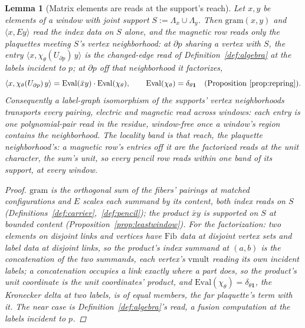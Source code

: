 \documentclass[11pt]{article}
\newtheorem{lemma}{Lemma}
\theoremstyle{definition}
\begin{document}
\begin{lemma}[Matrix elements are reads at the support's reach]
\label{lem:stableentries}
Let $x,y$ be elements of a window with joint support
$S:=\Lambda_x\cup\Lambda_y$. Then $\mathrm{gram}(x,y)$ and
$\langle x,Ey\rangle$ read the index data on $S$ alone, and the magnetic
row reads only the plaquettes meeting $S$'s vertex neighborhood: at
$\partial p$ sharing a vertex with $S$, the entry
$\langle x,\chi_\theta(U_{\partial p})\,y\rangle$ is the changed-edge read
of Definition~\ref{def:algebra} at the labels incident to $p$; at
$\partial p$ off that neighborhood it factorizes,
\[
\langle x,\chi_\theta(U_{\partial p})\,y\rangle
=\mathrm{Eval}(\bar xy)\cdot\mathrm{Eval}(\chi_\theta),
\qquad
\mathrm{Eval}(\chi_\theta)=\delta_{\theta\mathbf 1}
\quad(\text{Proposition~\ref{prop:repring}}) .
\]
Consequently a label-graph isomorphism of the supports' vertex
neighborhoods transports every pairing, electric and magnetic read across
windows: each entry is one polynomial-pair read in the residue, window-free
once a window's region
contains the neighborhood. The \emph{locality band} is that reach,
the plaquette neighborhood's: a magnetic row's entries off it are
the factorized reads at the unit character, the sum's unit, so
every pencil row reads within one band of its support, at every
window.
\begin{proof}
$\mathrm{gram}$ is the orthogonal sum of the fibers' pairings at matched
configurations and $E$ scales each summand by its content, both index
reads on $S$ (Definitions~\ref{def:carrier},~\ref{def:pencil}); the
product $\bar xy$ is supported on $S$ at bounded content
(Proposition~\ref{prop:leastwindow}). For the factorization: two elements
on disjoint links and vertices have $\mathrm{Fib}$ data at disjoint
vertex sets and label data at disjoint links, so the product's index
summand at $(a,b)$ is the concatenation of the two summands, each
vertex's $\mathrm{vmult}$ reading its own incident labels; a concatenation
occupies a link exactly where a part does, so the
product's unit coordinate is the unit coordinates' product,
and $\mathrm{Eval}(\chi_\theta)=\delta_{\theta\mathbf 1}$, the Kronecker
delta at two labels, is of equal members, the far
plaquette's term with it. The near case is Definition~\ref{def:algebra}'s read, a
fusion computation at the labels incident to $p$.
\end{proof}
\end{lemma}
\end{document}
